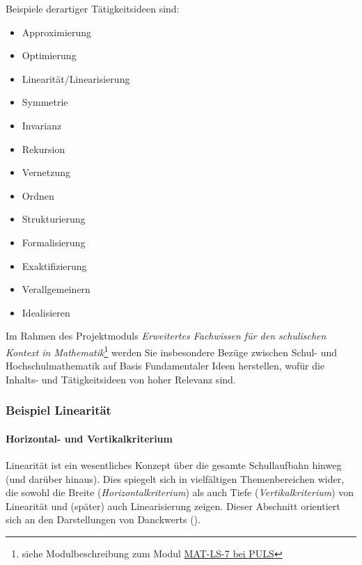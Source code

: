 \documentclass[
]{scrbook}
\providecommand{\tightlist}{%
  \setlength{\itemsep}{0pt}\setlength{\parskip}{0pt}}
\theoremstyle{definition}
\theoremstyle{definition}
\theoremstyle{definition}
\theoremstyle{definition}
\theoremstyle{remark}
\begin{document}
Beispiele derartiger Tätigkeitsideen sind:

\begin{itemize}
\tightlist
\item
  Approximierung
\item
  Optimierung
\item
  Linearität/Linearisierung
\item
  Symmetrie
\item
  Invarianz
\item
  Rekursion
\item
  Vernetzung
\item
  Ordnen
\item
  Strukturierung
\item
  Formalisierung
\item
  Exaktifizierung
\item
  Verallgemeinern
\item
  Idealisieren
\end{itemize}

Im Rahmen des Projektmoduls \emph{Erweitertes Fachwissen für den schulischen Kontext in Mathematik}\footnote{siehe Modulbeschreibung zum Modul \href{https://puls.uni-potsdam.de/qisserver/rds?state=verpublish&status=init&vmfile=no&moduleCall=modulansicht&publishConfFile=modulverwaltung&publishSubDir=up/modulbearbeiter&&modul.modul_id=3156&menuid=&topitem=Modulbeschreibung&subitem=}{MAT-LS-7 bei PULS}} werden Sie insbesondere Bezüge zwischen Schul- und Hochschulmathematik auf Basis Fundamentaler Ideen herstellen, wofür die Inhalts- und Tätigkeitsideen von hoher Relevanz sind.

\subsubsection{Beispiel Linearität}\label{beispiel-linearitaet}

\paragraph*{Horizontal- und Vertikalkriterium}\label{horizontal--und-vertikalkriterium}

Linearität ist ein wesentliches Konzept über die gesamte Schullaufbahn hinweg (und darüber hinaus). Dies spiegelt sich in vielfältigen Themenbereichen wider, die sowohl die Breite (\emph{Horizontalkriterium}) als auch Tiefe (\emph{Vertikalkriterium}) von Linearität und (später) auch Linearisierung zeigen. Dieser Abschnitt orientiert sich an den Darstellungen von Danckwerts ().
\end{document}
